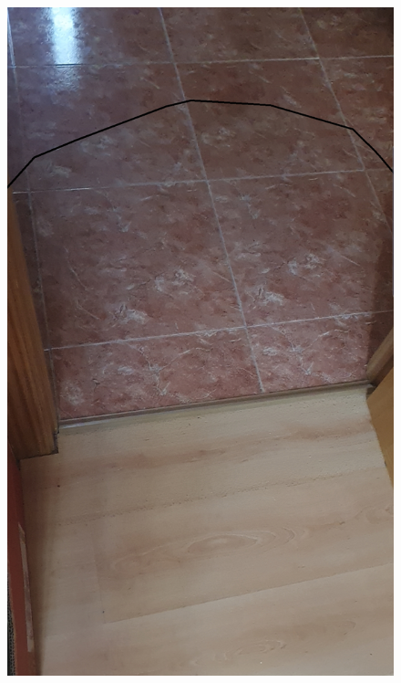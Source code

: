 \begin{figure}[H]
\centering
    \hspace{-4mm}
    \begin{minipage}{0.5\textwidth}
        \centering
        \includegraphics[scale=0.15]{Images/Shaders/oclusion (1).jpg}\\
    \end{minipage}
    \begin{minipage}{0.5\textwidth}
        \centering

\end{minipage}
\end{figure}
